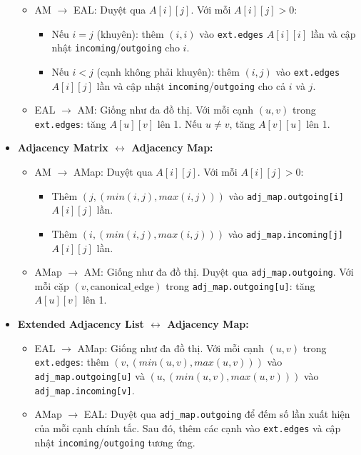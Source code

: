 \documentclass{article}
\begin{document}
\begin{itemize}
    \begin{itemize}
        \item AM $\to$ EAL: Duyệt qua $A[i][j]$. Với mỗi $A[i][j] > 0$:
        \begin{itemize}
            \item Nếu $i = j$ (khuyên): thêm $(i,i)$ vào \texttt{ext.edges} $A[i][i]$ lần và cập nhật \texttt{incoming}/\texttt{outgoing} cho $i$.
            \item Nếu $i < j$ (cạnh không phải khuyên): thêm $(i,j)$ vào \texttt{ext.edges} $A[i][j]$ lần và cập nhật \texttt{incoming}/\texttt{outgoing} cho cả $i$ và $j$.
        \end{itemize}
        \item EAL $\to$ AM: Giống như đa đồ thị. Với mỗi cạnh $(u,v)$ trong \texttt{ext.edges}: tăng $A[u][v]$ lên 1. Nếu $u \neq v$, tăng $A[v][u]$ lên 1.
    \Hfill
    \end{itemize}
    \item \textbf{Adjacency Matrix $\leftrightarrow$ Adjacency Map:}
    \begin{itemize}
        \item AM $\to$ AMap: Duyệt qua $A[i][j]$. Với mỗi $A[i][j] > 0$:
        \begin{itemize}
            \item Thêm $(j, (min(i,j), max(i,j)))$ vào \texttt{adj\_map.outgoing[i]} $A[i][j]$ lần.
            \item Thêm $(i, (min(i,j), max(i,j)))$ vào \texttt{adj\_map.incoming[j]} $A[i][j]$ lần.
        \end{itemize}
        \item AMap $\to$ AM: Giống như đa đồ thị. Duyệt qua \texttt{adj\_map.outgoing}. Với mỗi cặp $(v, \text{canonical\_edge})$ trong \texttt{adj\_map.outgoing[u]}: tăng $A[u][v]$ lên 1.
    \end{itemize}
    \item \textbf{Extended Adjacency List $\leftrightarrow$ Adjacency Map:}
    \begin{itemize}
        \item EAL $\to$ AMap: Giống như đa đồ thị. Với mỗi cạnh $(u,v)$ trong \texttt{ext.edges}: thêm $(v, (min(u,v), max(u,v)))$ vào \texttt{adj\_map.outgoing[u]} và $(u, (min(u,v), max(u,v)))$ vào \texttt{adj\_map.incoming[v]}.
        \item AMap $\to$ EAL: Duyệt qua \texttt{adj\_map.outgoing} để đếm số lần xuất hiện của mỗi cạnh chính tắc. Sau đó, thêm các cạnh vào \texttt{ext.edges} và cập nhật \texttt{incoming}/\texttt{outgoing} tương ứng.
    \end{itemize}
\end{itemize}
\end{document}
